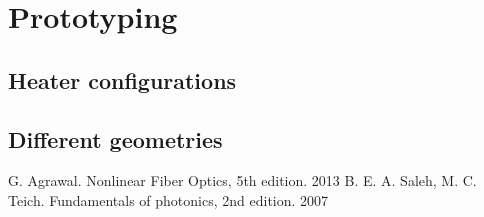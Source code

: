 \documentclass[12pt,a4paper]{article}
\begin{document}
\section{Prototyping}
\subsection{Heater configurations}
\subsection{Different geometries}

\newpage
\begin{thebibliography}{9}
 G. Agrawal. Nonlinear Fiber Optics, 5th edition. 2013
 B. E. A. Saleh, M. C. Teich. Fundamentals of photonics, 2nd edition. 2007
\end{thebibliography}
\end{document}
